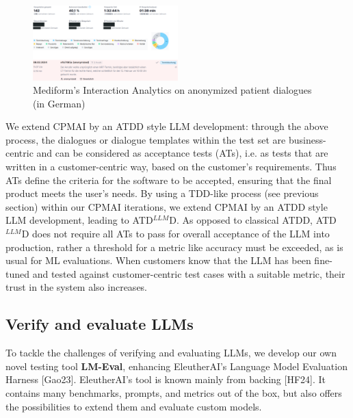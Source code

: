 \documentclass[twocolumn]{article}
\newcommand{\ATDLLMD}{ATD$^{LLM}$D}%
\begin{document}
\begin{figure}[hbt!]
  \begin{center}
\includegraphics[width=0.5\textwidth]{figures/InteractionAnalytics}
  \vspace{-8mm}
\caption{Mediform’s Interaction Analytics on anonymized patient dialogues (in German)}
\label{fig:interactionanalytics}
\end{center}
\end{figure}

We extend CPMAI by an ATDD style LLM development: through the above process, the dialogues or dialogue templates within the test set are business-centric and can be considered as acceptance tests (ATs), i.e. as tests that are written  in a customer-centric way, based on the customer’s requirements. Thus ATs define the criteria for the software to be accepted, ensuring that the final product meets the user's needs. By using a TDD-like process (see previous section) within our CPMAI iterations, we extend CPMAI by an ATDD style LLM development, leading to \ATDLLMD{}. As opposed to classical ATDD, \ATDLLMD{} does not require all ATs to pass for overall acceptance of the LLM into production, rather a threshold for a metric like accuracy must be exceeded, as is usual for ML evaluations. When customers know that the LLM has been fine-tuned and tested against customer-centric test cases with a suitable metric, their trust in the system also increases.


\subsection{Verify and evaluate LLMs}

To tackle the challenges of verifying and evaluating LLMs, we develop our own novel testing tool {\bfseries LM-Eval}, enhancing EleutherAI’s Language Model Evaluation Harness [Gao23]. EleutherAI’s tool is known mainly from backing [HF24]. It contains many benchmarks, prompts, and metrics out of the box, but also offers the possibilities to extend them and evaluate custom models.
\end{document}
